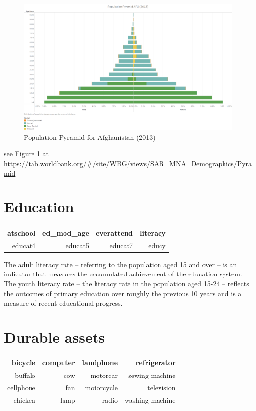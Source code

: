 \documentclass[13 pt,]{book}
\begin{document}
\begin{figure}

{\centering \includegraphics[width=0.8\linewidth]{figures/Pyramid} 

}

\caption{Population Pyramid for Afghanistan (2013)}\label{fig:pyramid}
\end{figure}

see Figure \ref{fig:pyramid} at
\url{https://tab.worldbank.org/\#/site/WBG/views/SAR_MNA_Demographics/Pyramid}

\section{Education}\label{education}

\begin{longtable}[]{@{}rrrr@{}}
\toprule
atschool & ed\_mod\_age & everattend & literacy\tabularnewline
\midrule
\endhead
educat4 & educat5 & educat7 & educy\tabularnewline
\bottomrule
\end{longtable}

The adult literacy rate -- referring to the population aged 15 and over
-- is an indicator that measures the accumulated achievement of the
education system. The youth literacy rate -- the literacy rate in the
population aged 15-24 -- reflects the outcomes of primary education over
roughly the previous 10 years and is a measure of recent educational
progress.

\section{Durable assets}\label{durable-assets-1}

\begin{longtable}[]{@{}rrrr@{}}
\toprule
bicycle & computer & landphone & refrigerator\tabularnewline
\midrule
\endhead
buffalo & cow & motorcar & sewing machine\tabularnewline
cellphone & fan & motorcycle & television\tabularnewline
chicken & lamp & radio & washing machine\tabularnewline
\bottomrule
\end{longtable}
\end{document}

